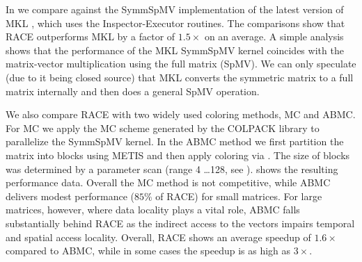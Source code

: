 In  we compare against the \acrshort{SymmSpMV} 
implementation of the latest version of \acrshort{MKL} \cite{MKL},
which uses the Inspector-Executor routines.
The comparisons show that \acrshort{RACE} outperforms MKL
by a factor of $1.5\times$ on an average. 
A simple analysis
shows that the performance of the \acrshort{MKL} \acrshort{SymmSpMV} 
kernel coincides with the matrix-vector multiplication using the full
matrix (\acrshort{SpMV}). We can only speculate (due to it being closed source) that MKL converts
the symmetric matrix to a full matrix internally and then does a general \acrshort{SpMV} operation.

We also compare \acrshort{RACE} with two widely used
coloring methods, \acrshort{MC} and \acrshort{ABMC}.
For \acrshort{MC} we apply the \acrlong{MC} scheme
generated by the COLPACK \cite{COLPACK} library to parallelize the \acrshort{SymmSpMV}
kernel. In the \acrshort{ABMC} method we first partition the matrix into blocks
using METIS \cite{METIS} and then apply coloring via \COLPACK. The
size of blocks was determined by a parameter scan (range 4 \ldots 128, see \cite{ABMC}).
 shows the resulting performance data. 
Overall the \acrshort{MC} method is not competitive, while \acrshort{ABMC} delivers
modest performance ($85\%$ of \acrshort{RACE}) for small matrices. For large
matrices,  however, where data locality plays a vital role, \acrshort{ABMC} 
falls substantially behind \acrshort{RACE} as the indirect access to the vectors
impairs temporal and spatial access locality.
Overall, \acrshort{RACE} shows an average speedup of $1.6\times$ compared to 
\acrshort{ABMC}, while in some cases the speedup is as high as $3\times$.





